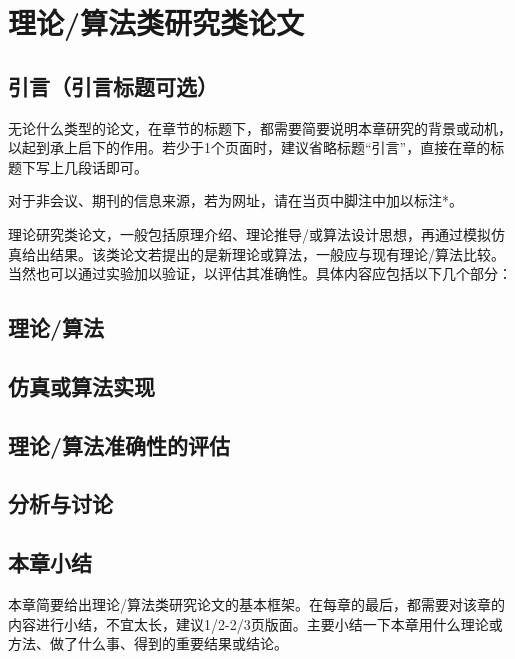 \chapter{理论/算法类研究类论文}
\label{cha:fourthsection}



\section{引言（引言标题可选）}
\label{sec:parameters}
无论什么类型的论文，在章节的标题下，都需要简要说明本章研究的背景或动机，以起到承上启下的作用。若少于1个页面时，建议省略标题“引言”，直接在章的标题下写上几段话即可。

对于非会议、期刊的信息来源，若为网址，请在当页中脚注中加以标注*。

理论研究类论文，一般包括原理介绍、理论推导/或算法设计思想，再通过模拟仿真给出结果。该类论文若提出的是新理论或算法，一般应与现有理论/算法比较。当然也可以通过实验加以验证，以评估其准确性。具体内容应包括以下几个部分：


\section{理论/算法}

\section{仿真或算法实现}

\section{理论/算法准确性的评估}

\section{分析与讨论}

\section{本章小结}
本章简要给出理论/算法类研究论文的基本框架。在每章的最后，都需要对该章的内容进行小结，不宜太长，建议1/2-2/3页版面。主要小结一下本章用什么理论或方法、做了什么事、得到的重要结果或结论。
